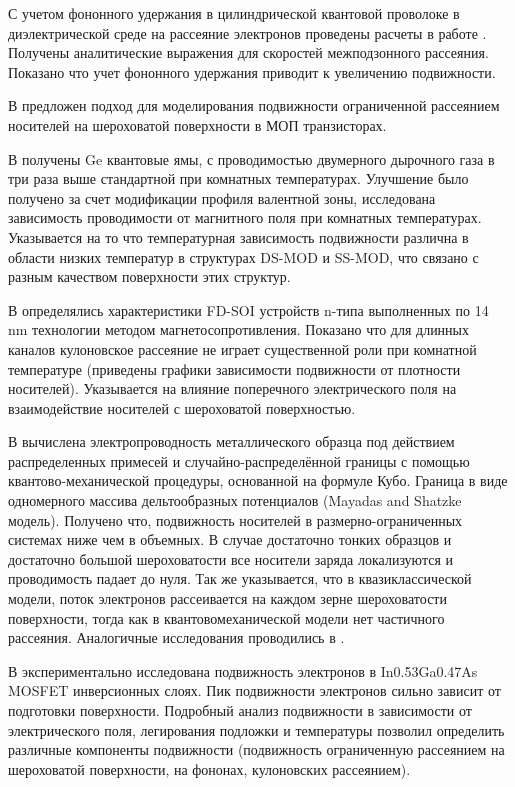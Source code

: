 С учетом фононного удержания в цилиндрической квантовой проволоке в диэлектрической среде на рассеяние электронов проведены расчеты в работе \cite{Vartanian2003}. Получены аналитические выражения для скоростей межподзонного рассеяния. Показано что учет фононного удержания приводит к увеличению подвижности.

В \cite{Lizzit2013} предложен подход для моделирования подвижности ограниченной рассеянием носителей на шероховатой поверхности в МОП транзисторах.

В \cite{Myronov2008a,Myronov2008,Mironov2014,Myronov2015} получены Ge квантовые ямы, с проводимостью двумерного дырочного газа в три раза выше стандартной при комнатных температурах. Улучшение было получено за счет модификации профиля валентной зоны, исследована зависимость проводимости от магнитного поля при комнатных температурах. Указывается на то что температурная зависимость подвижности различна в области низких температур в структурах DS-MOD и SS-MOD, что связано с разным качеством поверхности этих структур.

В \cite{Shin2015} определялись характеристики FD-SOI устройств n-типа выполненных по 14 nm технологии методом магнетосопротивления. Показано что для длинных каналов кулоновское рассеяние не играет существенной роли при комнатной температуре (приведены графики зависимости подвижности от плотности носителей). Указывается на влияние поперечного электрического поля на взаимодействие носителей с шероховатой поверхностью. 

В \cite{Moraga2015} вычислена электропроводность металлического образца под действием распределенных примесей и случайно-распределённой границы с помощью квантово-механической процедуры, основанной на формуле Кубо. Граница в виде одномерного массива дельтообразных потенциалов (Mayadas and Shatzke модель). Получено что, подвижность носителей в размерно-ограниченных системах ниже чем в объемных. В случае достаточно тонких образцов и достаточно большой шероховатости все носители заряда локализуются и проводимость падает до нуля. Так же указывается, что в квазиклассической модели, поток электронов рассеивается на каждом зерне шероховатости поверхности, тогда как в квантовомеханической модели нет частичного рассеяния. Аналогичные исследования проводились в \cite{Arenas2015}.

В \cite{Sonnet2011} экспериментально исследована подвижность электронов в In0.53Ga0.47As MOSFET инверсионных слоях. Пик подвижности электронов сильно зависит от подготовки поверхности. Подробный анализ подвижности в зависимости от электрического поля, легирования подложки и температуры позволил определить различные компоненты подвижности (подвижность ограниченную рассеянием на шероховатой поверхности, на фононах, кулоновских рассеянием).

